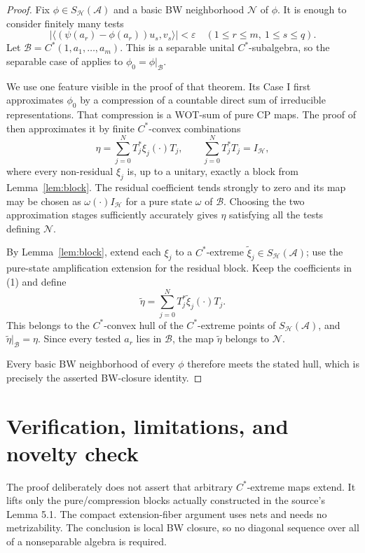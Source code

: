 \documentclass[11pt]{article}
\newcommand{\A}{\mathcal A}
\newcommand{\B}{\mathcal B}
\newcommand{\Hh}{\mathcal H}
\begin{document}
\begin{proof}
Fix $\phi\in S_{\Hh}(\A)$ and a basic BW neighborhood $\mathcal N$ of $\phi$.
It is enough to consider finitely many tests
\[
 |\langle(\psi(a_r)-\phi(a_r))u_s,v_s\rangle|<\varepsilon
 \quad(1\leq r\leq m,\ 1\leq s\leq q).
\]
Let $\B=C^*(1,a_1,\ldots,a_m)$. This is a separable unital $C^*$-subalgebra,
so the separable case of \cite[Theorem 5.3]{BK} applies to
$\phi_0=\phi|_{\B}$.

We use one feature visible in the proof of that theorem. Its Case I first
approximates $\phi_0$ by a compression of a countable direct sum of irreducible
representations. That compression is a WOT-sum of pure CP maps. The proof of
\cite[Lemma 5.1]{BK} then approximates it by finite $C^*$-convex combinations
\[
 \eta=\sum_{j=0}^{N}T_j^*\xi_j(\mathord\cdot)T_j,
 \qquad \sum_{j=0}^{N}T_j^*T_j=I_{\Hh},                         \tag{1}
\]
where every non-residual $\xi_j$ is, up to a unitary, exactly a block from
Lemma~\ref{lem:block}. The residual coefficient tends strongly to zero and its
map may be chosen as $\omega(\mathord\cdot)I_{\Hh}$ for a pure state $\omega$
of $\B$. Choosing the two approximation stages sufficiently accurately gives
$\eta$ satisfying all the tests defining $\mathcal N$.

By Lemma~\ref{lem:block}, extend each $\xi_j$ to a $C^*$-extreme
$\widetilde\xi_j\in S_{\Hh}(\A)$; use the pure-state amplification extension for
the residual block. Keep the coefficients in (1) and define
\[
 \widetilde\eta=\sum_{j=0}^{N}T_j^*\widetilde\xi_j(\mathord\cdot)T_j.
\]
This belongs to the $C^*$-convex hull of the $C^*$-extreme points of
$S_{\Hh}(\A)$, and $\widetilde\eta|_{\B}=\eta$. Since every tested $a_r$ lies in
$\B$, the map $\widetilde\eta$ belongs to $\mathcal N$.

Every basic BW neighborhood of every $\phi$ therefore meets the stated hull,
which is precisely the asserted BW-closure identity.
\end{proof}

\section*{Verification, limitations, and novelty check}

The proof deliberately does not assert that arbitrary $C^*$-extreme maps extend.
It lifts only the pure/compression blocks actually constructed in the source's
Lemma 5.1. The compact extension-fiber argument uses nets and needs no
metrizability. The conclusion is local BW closure, so no diagonal sequence over
all of a nonseparable algebra is required.
\end{document}
